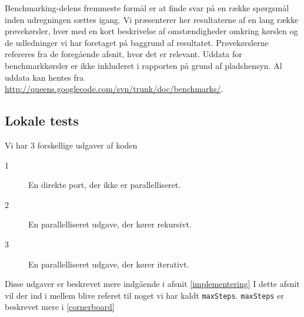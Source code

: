 Benchmarking-delens fremmeste formål er at finde svar på en række spørgsmål
inden udregningen sættes igang. Vi præsenterer her resultaterne af en lang række prøvekørsler, hver med en kort beskrivelse af omstændigheder omkring kørslen og de udledninger vi har foretaget på baggrund af resultatet. Prøvekørslerne refereres fra de foregående afsnit, hvor det er relevant. Uddata for benchmarkkørsler er ikke inkluderet i rapporten på grund af pladshensyn. Al uddata kan hentes fra \url{http://queens.googlecode.com/svn/trunk/doc/benchmarks/}.

\subsection{Lokale tests}

Vi har 3 forskellige udgaver af koden
\begin{description}
\item[1] En direkte port, der ikke er parallelliseret.
\item[2] En parallelliseret udgave, der kører rekursivt.
\item[3] En parallelliseret udgave, der kører iterativt.
\end{description}

Disse udgaver er beskrevet mere indgående i afsnit \ref{implementering}
I dette afsnit vil der ind i mellem blive referet til noget vi har kaldt
\texttt{maxSteps}. \texttt{maxSteps} er beskrevet mere i \ref{cornerboard} 

